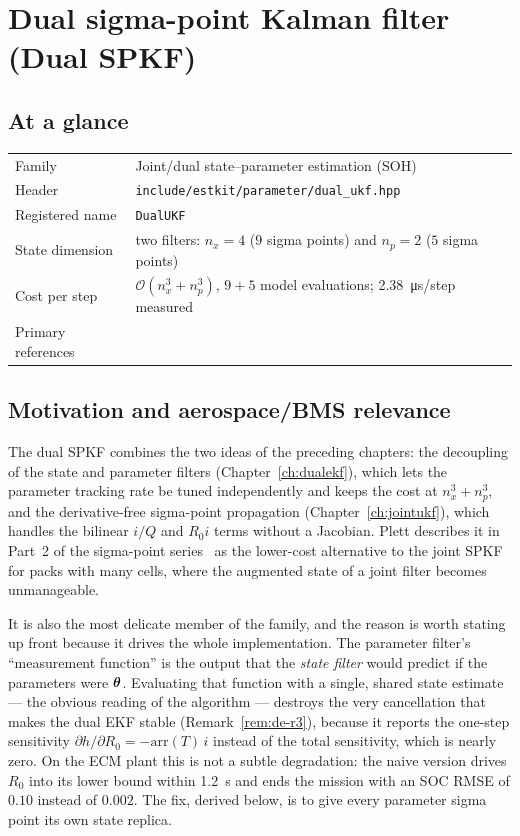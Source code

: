 \chapter{Dual sigma-point Kalman filter (Dual SPKF)}
\label{ch:dualukf}

\section*{At a glance}
\begin{tabular}{@{}l>{\raggedright\arraybackslash}p{}@{}}
Family & Joint/dual state--parameter estimation (SOH) \\
Header & \texttt{include/estkit/parameter/dual\_ukf.hpp} \\
Registered name & \texttt{DualUKF} \\
State dimension & two filters: $n_x=4$ ($9$ sigma points) and $n_p=2$ ($5$ sigma points) \\
Cost per step & $\mathcal{O}(n_x^3+n_p^3)$, $9+5$ model evaluations; \SI{2.38}{\micro\second}/step measured \\
Primary references & \cite{plett2006spkf2,wannelson2001dual,plett2004ekf3,julier2004unscented} \\
\end{tabular}

\section{Motivation and aerospace/BMS relevance}
The dual SPKF combines the two ideas of the preceding chapters: the decoupling of the state and
parameter filters (Chapter~\ref{ch:dualekf}), which lets the parameter tracking rate be tuned
independently and keeps the cost at $n_x^3+n_p^3$, and the derivative-free sigma-point propagation
(Chapter~\ref{ch:jointukf}), which handles the bilinear $i/Q$ and $R_0 i$ terms without a Jacobian.
Plett describes it in Part~2 of the sigma-point series~\cite{plett2006spkf2} as the
lower-cost alternative to the joint SPKF for packs with many cells, where the augmented state of a
joint filter becomes unmanageable.

It is also the most delicate member of the family, and the reason is worth stating up front because
it drives the whole implementation.  The parameter filter's ``measurement function'' is the output
that the \emph{state filter} would predict if the parameters were $\bm{\theta}$.  Evaluating that
function with a single, shared state estimate --- the obvious reading of the algorithm --- destroys
the very cancellation that makes the dual EKF stable (Remark~\ref{rem:de-r3}), because it reports
the one-step sensitivity $\partial h/\partial R_0=-\mathrm{arr}(T)\,i$ instead of the total
sensitivity, which is nearly zero.  On the ECM plant this is not a subtle degradation: the naive
version drives $R_0$ into its lower bound within \SI{1.2}{\second} and ends the mission with an SOC
RMSE of $0.10$ instead of $0.002$.  The fix, derived below, is to give every parameter sigma point
its own state replica.

